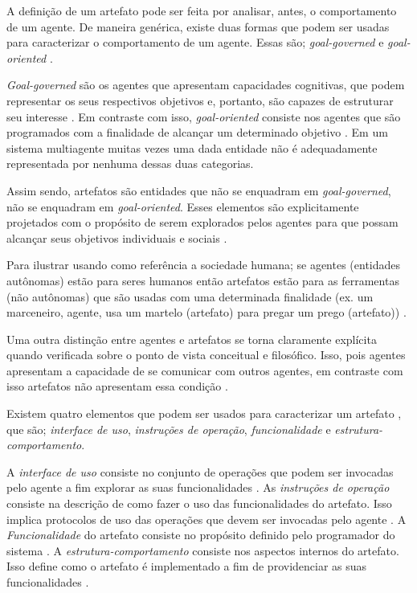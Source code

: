 A definição de um artefato pode ser feita por analisar, antes, o comportamento de um agente. De maneira genérica, existe duas formas que podem ser usadas para caracterizar o comportamento de um agente. Essas são; \textit{goal-governed} e \textit{goal-oriented} \cite{relationwithagentprogram} \cite{programingagentartefact}.

\textit{Goal-governed} são os agentes que apresentam capacidades cognitivas, que podem representar os seus respectivos objetivos e, portanto, são capazes de estruturar seu interesse \cite{relationwithagentprogram} \cite{programingagentartefact}. Em contraste com isso, \textit{goal-oriented} consiste nos agentes que são programados com a finalidade de alcançar um determinado objetivo \cite{relationwithagentprogram} \cite{programingagentartefact}. Em um sistema multiagente muitas vezes
uma dada entidade não é adequadamente representada por nenhuma dessas duas categorias. 

Assim sendo, artefatos são entidades que não se enquadram em  \textit{goal-governed}, não se enquadram em \textit{goal-oriented}. Esses elementos são explicitamente projetados com o propósito de serem explorados pelos agentes para que possam alcançar seus objetivos individuais e sociais \cite{programingagentartefact} \cite{cartago}. 

Para ilustrar usando como referência a sociedade humana; se agentes (entidades autônomas) estão para seres humanos então artefatos estão para as ferramentas (não autônomas) que são usadas com uma determinada finalidade (ex. um marceneiro, agente, usa um martelo (artefato) para pregar um prego (artefato)) \cite{programingagentartefact}.

Uma outra distinção entre agentes e artefatos se torna claramente explícita quando verificada sobre o ponto de vista conceitual e filosófico. Isso, pois agentes apresentam a capacidade de se comunicar com outros agentes, em contraste com isso artefatos não apresentam essa condição \cite{programingagentartefact}.

Existem quatro elementos que podem ser usados para caracterizar um artefato \cite{programingagentartefact}, que são; \textit{interface de uso}, \textit{instruções de operação}, \textit{funcionalidade} e \textit{estrutura-comportamento}.

A \textit{interface de uso} consiste no conjunto de operações que podem ser invocadas pelo agente a fim explorar as suas funcionalidades \cite{programingagentartefact}. As \textit{instruções de operação} consiste na descrição de como fazer o uso das funcionalidades do artefato. Isso implica protocolos de uso das operações que devem ser invocadas pelo agente \cite{programingagentartefact}. A \textit{Funcionalidade} do artefato consiste no propósito definido pelo programador do sistema \cite{programingagentartefact}. A \textit{estrutura-comportamento} consiste nos aspectos internos do artefato. Isso define como o artefato é implementado a fim de providenciar as suas funcionalidades \cite{programingagentartefact}.    

